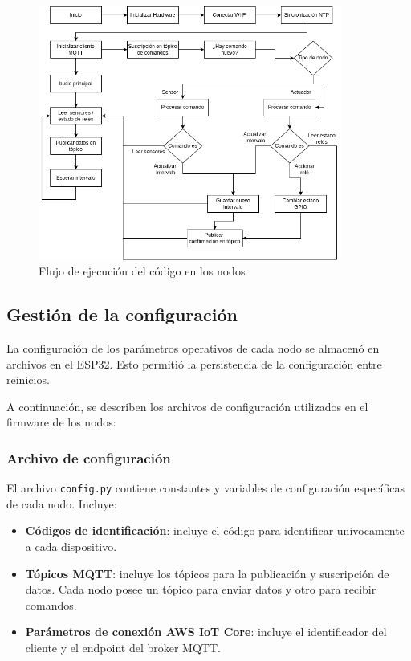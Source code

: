 \begin{figure}[H]
    \centering
    \includegraphics[width=0.89\textwidth]{./Images/30_flujo_ppal_nodos.png}
    \caption{Flujo de ejecución del código en los nodos}
    \label{fig:flujo_nodos}
\end{figure}


\subsection{Gestión de la configuración}

La configuración de los parámetros operativos de cada nodo se almacenó en
archivos en el ESP32. Esto permitió la persistencia de la configuración entre
reinicios.

A continuación, se describen los archivos de configuración utilizados en el
firmware de los nodos:

\subsubsection{Archivo de configuración}

El archivo \texttt{config.py} contiene constantes y variables de configuración
específicas de cada nodo. Incluye:
\begin{itemize}
    \item \textbf{Códigos de identificación}: incluye el código para identificar unívocamente
          a cada dispositivo.
    \item \textbf{Tópicos MQTT}: incluye los tópicos para la publicación y
          suscripción de datos. Cada nodo posee un tópico para enviar datos
          y otro para recibir comandos.
    \item \textbf{Parámetros de conexión AWS IoT Core}: incluye el identificador del cliente y el
          endpoint del broker MQTT.
\end{itemize}

